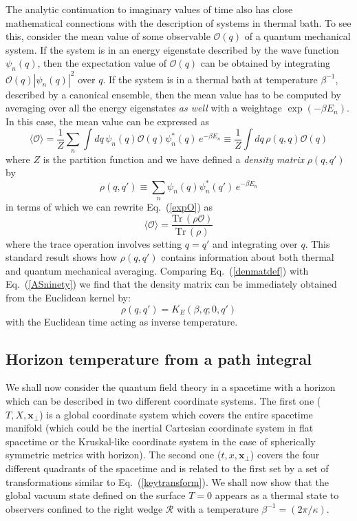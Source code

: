 \documentclass[12pt]{iopart}
\def\eq#1{{Eq.~(\ref{#1})}}
\begin{document}
The analytic continuation to imaginary values of time also has close mathematical
connections with the description of systems in thermal bath.
To see this, consider the mean value of some observable $\mathcal{O}(q)$ 
of a quantum mechanical system. If the system is in an energy eigenstate described
by the wave function $\psi_n(q)$, then the expectation value of $\mathcal{O}(q)$   can 
be obtained by integrating $\mathcal{O}(q)|\psi_n(q)|^2$ 
over $q$. If the system is in a thermal bath at temperature
$\beta^{-1}$, described by a canonical ensemble, 
then the mean value has to be computed by averaging over all the energy eigenstates \textit{as well}
with a weightage $\exp(-\beta E_n)$. In this case, the mean value
can be expressed as 
\begin{equation}
\langle \mathcal{O} \rangle = \frac{1}{Z} \sum_n \int dq\, \psi_n(q) \mathcal{O}(q) \psi^*_n(q)\,  e^{-\beta E_n} \equiv \frac{1}{Z}\int dq\, \rho (q,q) \mathcal{O}(q)
\label{expO}
\end{equation} 
where $Z$ is the partition function and we have defined a \textit{density matrix} $\rho(q,q') $ by
\begin{equation}
\rho(q,q') \equiv \sum_n \psi_n(q)\psi^*_n(q')\, e^{-\beta E_n}
\label{denmatdef}
\end{equation} 
in terms of which  we can rewrite \eq{expO} as
\begin{equation}
\langle \mathcal{O} \rangle = \frac{\mathrm{Tr}\, (\rho \mathcal{O})}{\mathrm{Tr}\, (\rho)}
\end{equation} 
where the trace operation involves setting $q=q'$ and integrating over $q$.
This standard result shows how $\rho(q,q')$ contains information about 
both thermal and quantum mechanical averaging.
Comparing \eq{denmatdef} with \eq{ASninety} 
we find that the density matrix can be immediately obtained from the Euclidean
kernel by:
\begin{equation}
\rho(q,q')  = K_E(\beta,q; 0,q')
\end{equation} 
with the Euclidean time acting as inverse temperature.
  
  
  \subsection{Horizon temperature from a path integral}\label{thermalden}
  
  We shall now consider the quantum field theory in a spacetime with a horizon which  can be described in two different coordinate systems. The first one ($T,X,\mathbf{x}_\perp$) is a global coordinate system which covers the entire spacetime manifold (which could be the inertial Cartesian coordinate system 
  in flat spacetime or the Kruskal-like coordinate system in the case of spherically symmetric metrics with  horizon).  The second one ($t,x,\mathbf{x}_\perp$)
  covers the four different quadrants of the spacetime and is related to the first set  
 by a set of transformations similar to \eq{keytransform}. 
 We shall now show  that the global vacuum state defined on the surface $T=0$ appears as a thermal state to observers confined to the right wedge $\mathcal{R}$ with a temperature $\beta^{-1} = (2\pi/\kappa)$. 
 
\end{document}
